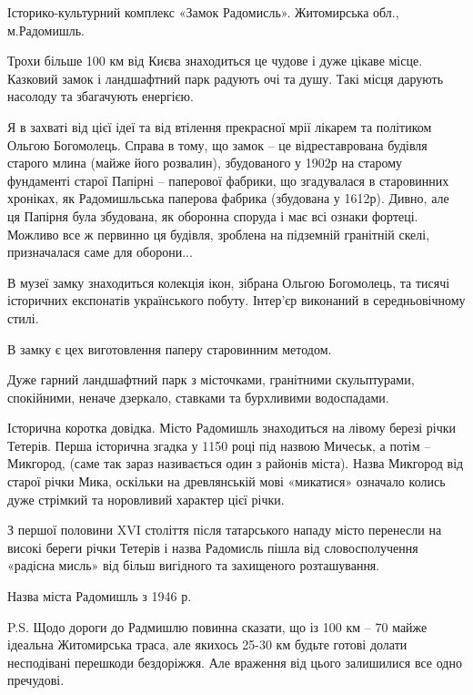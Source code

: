 Історико-культурний комплекс «Замок Радомисль». Житомирська обл., м.Радомишль.

Трохи більше 100 км від Києва знаходиться це чудове і дуже цікаве місце.
Казковий замок і ландшафтний парк радують очі та душу. Такі місця дарують
насолоду та збагачують енергією.


Я в захваті від цієї ідеї та від втілення прекрасної мрії лікарем та політиком
Ольгою Богомолець. Справа в тому, що замок – це відреставрована будівля старого
млина (майже його розвалин), збудованого у 1902р на старому фундаменті старої
Папірні – паперової фабрики, що згадувалася в старовинних хроніках, як
Радомишльська паперова фабрика (збудована у 1612р). Дивно, але ця Папірня була
збудована, як оборонна споруда і має всі ознаки фортеці. Можливо все ж первинно
ця будівля, зроблена на підземній гранітній скелі, призначалася саме для
оборони...


В музеї замку знаходиться колекція ікон, зібрана Ольгою Богомолець, та тисячі
історичних експонатів українського побуту. Інтер’єр виконаний в середньовічному
стилі. 

В замку є цех виготовлення паперу старовинним методом.


Дуже гарний ландшафтний парк з місточками, гранітними скульптурами, спокійними,
неначе дзеркало, ставками та бурхливими водоспадами.


Історична коротка довідка. Місто Радомишль знаходиться на лівому березі річки
Тетерів. Перша історична згадка у 1150 році під назвою Мичеськ, а потім –
Микгород, (саме так зараз називається один з районів міста). Назва Микгород від
старої річки Мика, оскільки на древлянській мові «микатися» означало колись
дуже стрімкий та норовливий характер цієї річки. 


З першої половини XVI століття після татарського нападу місто перенесли на
високі береги річки Тетерів і назва Радомисль пішла від словосполучення
«радісна мисль» від більш вигідного та захищеного розташування.


Назва міста Радомишль з 1946 р.

P.S. Щодо дороги до Радмишлю повинна сказати, що із 100 км – 70 майже ідеальна
Житомирська траса, але якихось 25-30 км будьте готові долати несподівані
перешкоди бездоріжжя. Але враження від цього залишилися все одно пречудові.

